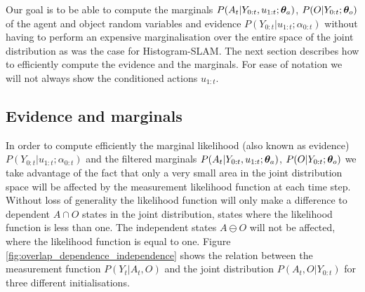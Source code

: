 Our goal is to be able to compute the marginals $P(A_t|Y_{0:t},u_{1:t};\boldsymbol{\theta}_a)$, $P(O|Y_{0:t};\boldsymbol{\theta}_o)$ of the agent and object random variables and 
evidence $P(Y_{0:t}|u_{1:t};\alpha_{0:t})$ without having to perform an expensive marginalisation over the entire space of the joint distribution 
as was the case for Histogram-SLAM.  The next section describes how to efficiently compute the evidence and the marginals.
For ease of notation we will not always show the conditioned actions $u_{1:t}$.

\subsection{Evidence and marginals}

In order to compute efficiently the marginal likelihood (also known as evidence) $P(Y_{0:t}|u_{1:t};\alpha_{0:t})$ and the filtered  marginals $P(A_t|Y_{0:t},u_{1:t};\boldsymbol{\theta}_a)$,
$P(O|Y_{0:t};\boldsymbol{\theta}_o)$ we take advantage of the fact that only a very small area 
in the joint distribution space will be affected by the measurement likelihood function at each time step.
Without loss of generality the likelihood function will only make a difference to dependent $A \cap O$ states in the joint distribution, states 
where the likelihood function is less than one. The independent states $A \ominus O$ will not be affected, where the likelihood function 
is equal to one.
Figure \ref{fig:overlap_dependence_independence} shows the relation between the measurement 
function $P(Y_t|A_t,O)$ and the joint distribution $P(A_t,O|Y_{0:t})$ for three different initialisations. 
 
